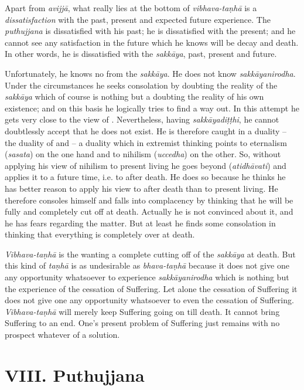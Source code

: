 \protect\hypertarget{vibhava-tanha}{}{}Apart from \emph{avijjā}, what really lies at the bottom of \emph{vibhava-taṇhā} is a \emph{dissatisfaction} with the past, present and expected future experience. The \emph{puthujjana} is dissatisfied with his past; he is dissatisfied with the present; and he cannot see any satisfaction in the future which he knows will be decay and death. In other words, he is dissatisfied with the \emph{sakkāya}, past, present and future.

Unfortunately, he knows no  from the \emph{sakkāya}. He does not know \emph{sakkāyanirodha}. Under the circumstances he seeks consolation by doubting the reality of the \emph{sakkāya} which of course is nothing but a doubting the reality of his own existence; and on this basis he logically tries to find a way out. In this attempt he gets very close to the view of . Nevertheless, having \emph{sakkāyadiṭṭhi}, he cannot doubtlessly accept that he does not exist. He is therefore caught in a duality -- the duality of  and  -- a duality which in extremist thinking points to eternalism (\emph{sasata}) on the one hand and to nihilism (\emph{uccedha}) on the other. So, without applying his view of nihilism to present living he goes beyond (\emph{atidhāvati}) and applies it to a future time, i.e. to after death. He does so because he thinks he has better reason to apply his view to after death than to present living. He therefore consoles himself and falls into complacency by thinking that he will be fully and completely cut off at death. Actually he is not convinced about it, and he has fears regarding the matter. But at least he finds some consolation in thinking that everything is completely over at death.

\emph{Vibhava-taṇhā} is the wanting a complete cutting off of the \emph{sakkāya} at death. But this kind of \emph{taṇhā} is as undesirable as \emph{bhava-taṇhā} because it does not give one any opportunity whatsoever to experience \emph{sakkāyanirodha} which is nothing but the experience of the cessation of Suffering. Let alone  the cessation of Suffering it does not give one any opportunity whatsoever to even  the cessation of Suffering. \emph{Vibhava-taṇhā} will merely keep Suffering going on till death. It cannot bring Suffering to an end. One's present problem of Suffering just remains with no prospect whatever of a solution.

\hypertarget{_viii_puthujjana}{%
\section{VIII. Puthujjana}\label{_viii_puthujjana}}

